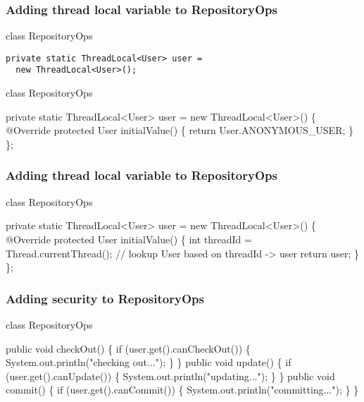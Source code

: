 \documentclass{beamer}
\begin{document}
\begin{frame}[fragile]
  \frametitle{Adding thread local variable to RepositoryOps}

\begin{block}{class RepositoryOps}
\begin{verbatim}
private static ThreadLocal<User> user =
  new ThreadLocal<User>();
\end{verbatim}
\end{block}

\pause

\begin{block}{class RepositoryOps}
\begin{semiverbatim}
private static ThreadLocal<User> user =
  new ThreadLocal<User>() \{
    \alert{@Override}
    \alert{protected User initialValue() \{}
      \alert{return User.ANONYMOUS_USER;}
    \alert{\}}
  \};
\end{semiverbatim}
\end{block}

\end{frame}

\begin{frame}[fragile]
  \frametitle{Adding thread local variable to RepositoryOps}

\begin{block}{class RepositoryOps}
\begin{semiverbatim}
private static ThreadLocal<User> user =
  new ThreadLocal<User>() \{
    @Override
    protected User initialValue() \{
      \alert{int threadId = Thread.currentThread();}
      \alert{// lookup User based on threadId -> user}
      \alert{return user;}
    \}
  \};
\end{semiverbatim}
\end{block}

\end{frame}

\begin{frame}[fragile]
  \frametitle{Adding security to RepositoryOps}

\begin{block}{class RepositoryOps}
\begin{semiverbatim}
public void checkOut() \{
  \alert{if (user.get().canCheckOut()) \{}
    System.out.println("checking out...");
  \alert{\}}
\}
public void update() \{
  \alert{if (user.get().canUpdate()) \{}
    System.out.println("updating...");
  \alert{\}}
\}
public void commit() \{
  \alert{if (user.get().canCommit()) \{}
    System.out.println("committing...");
  \alert{\}}
\}
\end{semiverbatim}
\end{block}

\end{frame}
\end{document}
